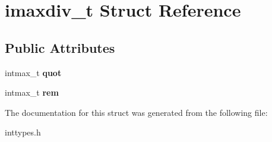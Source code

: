 \hypertarget{a00151}{}\section{imaxdiv\+\_\+t Struct Reference}
\label{a00151}
\subsection*{Public Attributes}
\begin{DoxyCompactItemize}
\item 
intmax\+\_\+t {\bfseries quot}\hypertarget{a00151_a9339814cbb7610c72fb7d30c6573b393}{}\label{a00151_a9339814cbb7610c72fb7d30c6573b393}

\item 
intmax\+\_\+t {\bfseries rem}\hypertarget{a00151_a6c9701ad10bff81edae7ff679cae7850}{}\label{a00151_a6c9701ad10bff81edae7ff679cae7850}

\end{DoxyCompactItemize}


The documentation for this struct was generated from the following file\+:\begin{DoxyCompactItemize}
\item 
inttypes.\+h\end{DoxyCompactItemize}
